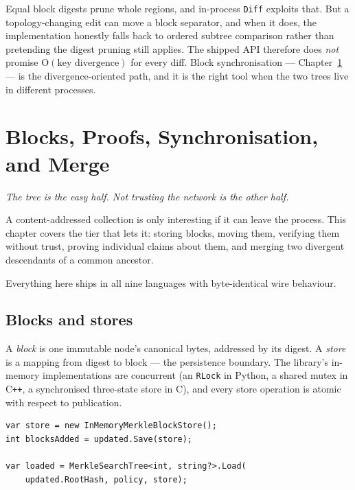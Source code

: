 \documentclass[11pt,twoside,openright]{book}
\newcommand{\code}[1]{\texorpdfstring{\textcolor{d7ink}{\texttt{#1}}}{#1}}
\newcommand{\term}[1]{\textit{#1}}
\newcommand{\bigoh}[1]{$\mathrm{O}(#1)$}
\newcommand{\motto}[1]{%
  \begingroup
  \vspace{-4pt}\hfill\begin{minipage}{0.80\textwidth}
    \raggedleft\itshape\color{d7slate}\small #1\par
  \end{minipage}\par\vspace{18pt}
  \endgroup}
\begin{document}
\begin{caveatbox}
Equal block digests prune whole regions, and in-process \code{Diff} exploits
that. But a topology-changing edit can move a block separator, and when it does,
the implementation honestly falls back to ordered subtree comparison rather than
pretending the digest pruning still applies. The shipped API therefore does
\emph{not} promise \bigoh{\text{key divergence}} for every diff. Block
synchronisation --- Chapter~\ref{ch:merkleops} --- is the divergence-oriented
path, and it is the right tool when the two trees live in different processes.
\end{caveatbox}

\chapter{Blocks, Proofs, Synchronisation, and Merge}
\label{ch:merkleops}

\motto{The tree is the easy half. Not trusting the network is the other half.}

\noindent
A content-addressed collection is only interesting if it can leave the process.
This chapter covers the tier that lets it: storing blocks, moving them,
verifying them without trust, proving individual claims about them, and merging
two divergent descendants of a common ancestor.

Everything here ships in all nine languages with byte-identical wire behaviour.

\section{Blocks and stores}

A \term{block} is one immutable node's canonical bytes, addressed by its digest.
A \term{store} is a mapping from digest to block --- the persistence boundary.
The library's in-memory implementations are concurrent (an \code{RLock} in
Python, a shared mutex in C\texttt{++}, a synchronised three-state store in C),
and every store operation is atomic with respect to publication.

\begin{lstlisting}[language={[Sharp]C}]
var store = new InMemoryMerkleBlockStore();
int blocksAdded = updated.Save(store);

var loaded = MerkleSearchTree<int, string?>.Load(
    updated.RootHash, policy, store);
\end{lstlisting}
\end{document}
